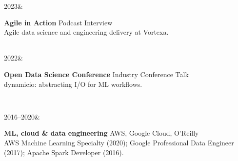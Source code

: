 \documentclass[]{../../../../friggeri-cv}
\renewcommand{\entrytwo}[4]{%
  #1&\parbox[t]{14cm}{%
    \textbf{#2}%
    \hfill%
    {\small\color{textcolor} #3}\\%
    #4\vspace{\parsep}%
  }\\}
\begin{document}
\begin{entrylist2}
    \entrytwo
        {\small 2023}
        {\small Agile in Action}
        {\small Podcast Interview}
        {\small Agile data science and engineering delivery at Vortexa.}
    \entrytwo
        {\small 2022}
        {\small Open Data Science Conference}
        {\small Industry Conference Talk}
        {\small dynamicio: abstracting I/O for ML workflows.}
\end{entrylist2}
\begin{entrylist2}
    \entrytwo
        {\small 2016--2020}
        {\small ML, cloud \& data engineering}
        {\small AWS, Google Cloud, O'Reilly}
        {\small AWS Machine Learning Specialty (2020); Google Professional Data Engineer (2017); Apache Spark Developer (2016).}
\end{entrylist2}
\end{document}
